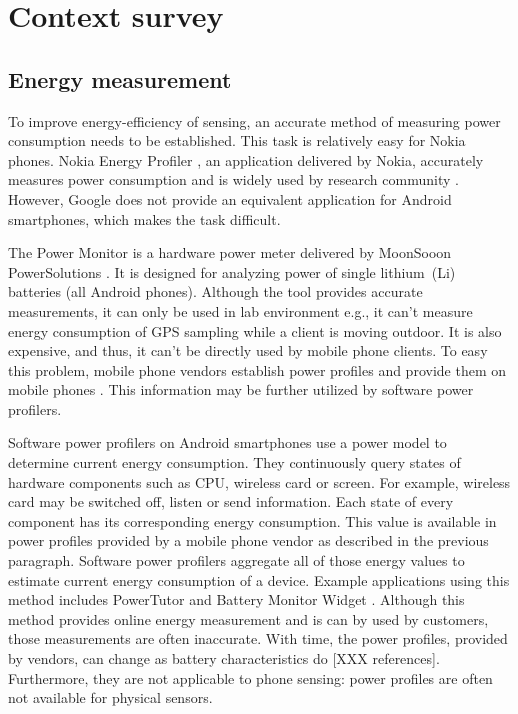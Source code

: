 \section{Context survey}
\label{s:contextsurvey}
\subsection{Energy measurement}
\hspace{10pt} To improve energy-efficiency of sensing, an accurate method of measuring power consumption needs to be established. This task is relatively easy for Nokia phones. Nokia Energy Profiler \cite{nokia:profiler}, an application delivered by Nokia,  accurately measures power consumption and is widely used by research community \cite{kjaergaard:entracked} \cite{lu:jigsaw} \cite{li:status}. However, Google does not provide an equivalent application for Android smartphones, which makes the task difficult.

The Power Monitor is a hardware power meter delivered by MoonSooon PowerSolutions \cite{monsoon:powermonitor}.  It is designed for analyzing power of single lithium\ (Li) batteries (all Android phones). Although the tool provides accurate measurements, it can only be used in lab environment e.g., it can't measure energy consumption of GPS sampling while a client is moving outdoor. It is also expensive, and thus, it can't be directly used by mobile phone clients. To easy this problem, mobile phone vendors establish power profiles and provide them on mobile phones \cite{android:powerprofiles}. This information may be further utilized by software power profilers.

Software power profilers on Android smartphones use a power model to determine current energy consumption. They continuously query states of hardware components such as CPU, wireless card or screen. For example, wireless card may be switched off, listen or send information. Each state of every component has its corresponding energy consumption. This value is available in power profiles provided by a mobile phone vendor as described in the previous paragraph. Software power profilers aggregate all of those energy values to estimate current energy consumption of a device. Example applications using this method includes PowerTutor \cite{zhang:powertutor} and Battery Monitor Widget \cite{googleplay:batterymonitorwidget}. Although this method provides online energy measurement and is can by used by customers, those measurements are often inaccurate. With time, the power profiles, provided by vendors, can change as battery characteristics do [XXX references]. Furthermore, they are not applicable to phone sensing: power profiles are often not available for physical sensors.

